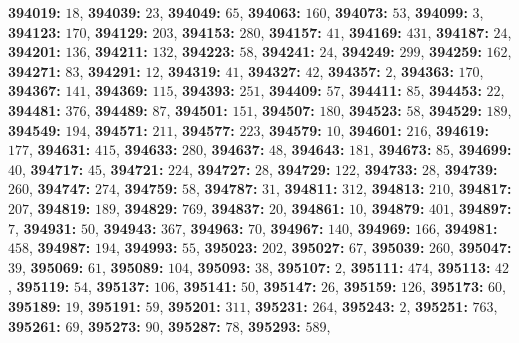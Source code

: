 \textsf{\bfseries 394019:} $18$, \textsf{\bfseries 394039:} $23$, \textsf{\bfseries 394049:} $65$, \textsf{\bfseries 394063:} $160$, \textsf{\bfseries 394073:} $53$, \textsf{\bfseries 394099:} $3$, \textsf{\bfseries 394123:} $170$, \textsf{\bfseries 394129:} $203$, \textsf{\bfseries 394153:} $280$, \textsf{\bfseries 394157:} $41$, \textsf{\bfseries 394169:} $431$, \textsf{\bfseries 394187:} $24$, \textsf{\bfseries 394201:} $136$, \textsf{\bfseries 394211:} $132$, \textsf{\bfseries 394223:} $58$, \textsf{\bfseries 394241:} $24$, \textsf{\bfseries 394249:} $299$, \textsf{\bfseries 394259:} $162$, \textsf{\bfseries 394271:} $83$, \textsf{\bfseries 394291:} $12$, \textsf{\bfseries 394319:} $41$, \textsf{\bfseries 394327:} $42$, \textsf{\bfseries 394357:} $2$, \textsf{\bfseries 394363:} $170$, \textsf{\bfseries 394367:} $141$, \textsf{\bfseries 394369:} $115$, \textsf{\bfseries 394393:} $251$, \textsf{\bfseries 394409:} $57$, \textsf{\bfseries 394411:} $85$, \textsf{\bfseries 394453:} $22$, \textsf{\bfseries 394481:} $376$, \textsf{\bfseries 394489:} $87$, \textsf{\bfseries 394501:} $151$, \textsf{\bfseries 394507:} $180$, \textsf{\bfseries 394523:} $58$, \textsf{\bfseries 394529:} $189$, \textsf{\bfseries 394549:} $194$, \textsf{\bfseries 394571:} $211$, \textsf{\bfseries 394577:} $223$, \textsf{\bfseries 394579:} $10$, \textsf{\bfseries 394601:} $216$, \textsf{\bfseries 394619:} $177$, \textsf{\bfseries 394631:} $415$, \textsf{\bfseries 394633:} $280$, \textsf{\bfseries 394637:} $48$, \textsf{\bfseries 394643:} $181$, \textsf{\bfseries 394673:} $85$, \textsf{\bfseries 394699:} $40$, \textsf{\bfseries 394717:} $45$, \textsf{\bfseries 394721:} $224$, \textsf{\bfseries 394727:} $28$, \textsf{\bfseries 394729:} $122$, \textsf{\bfseries 394733:} $28$, \textsf{\bfseries 394739:} $260$, \textsf{\bfseries 394747:} $274$, \textsf{\bfseries 394759:} $58$, \textsf{\bfseries 394787:} $31$, \textsf{\bfseries 394811:} $312$, \textsf{\bfseries 394813:} $210$, \textsf{\bfseries 394817:} $207$, \textsf{\bfseries 394819:} $189$, \textsf{\bfseries 394829:} $769$, \textsf{\bfseries 394837:} $20$, \textsf{\bfseries 394861:} $10$, \textsf{\bfseries 394879:} $401$, \textsf{\bfseries 394897:} $7$, \textsf{\bfseries 394931:} $50$, \textsf{\bfseries 394943:} $367$, \textsf{\bfseries 394963:} $70$, \textsf{\bfseries 394967:} $140$, \textsf{\bfseries 394969:} $166$, \textsf{\bfseries 394981:} $458$, \textsf{\bfseries 394987:} $194$, \textsf{\bfseries 394993:} $55$, \textsf{\bfseries 395023:} $202$, \textsf{\bfseries 395027:} $67$, \textsf{\bfseries 395039:} $260$, \textsf{\bfseries 395047:} $39$, \textsf{\bfseries 395069:} $61$, \textsf{\bfseries 395089:} $104$, \textsf{\bfseries 395093:} $38$, \textsf{\bfseries 395107:} $2$, \textsf{\bfseries 395111:} $474$, \textsf{\bfseries 395113:} $42$, \textsf{\bfseries 395119:} $54$, \textsf{\bfseries 395137:} $106$, \textsf{\bfseries 395141:} $50$, \textsf{\bfseries 395147:} $26$, \textsf{\bfseries 395159:} $126$, \textsf{\bfseries 395173:} $60$, \textsf{\bfseries 395189:} $19$, \textsf{\bfseries 395191:} $59$, \textsf{\bfseries 395201:} $311$, \textsf{\bfseries 395231:} $264$, \textsf{\bfseries 395243:} $2$, \textsf{\bfseries 395251:} $763$, \textsf{\bfseries 395261:} $69$, \textsf{\bfseries 395273:} $90$, \textsf{\bfseries 395287:} $78$, \textsf{\bfseries 395293:} $589$, 
